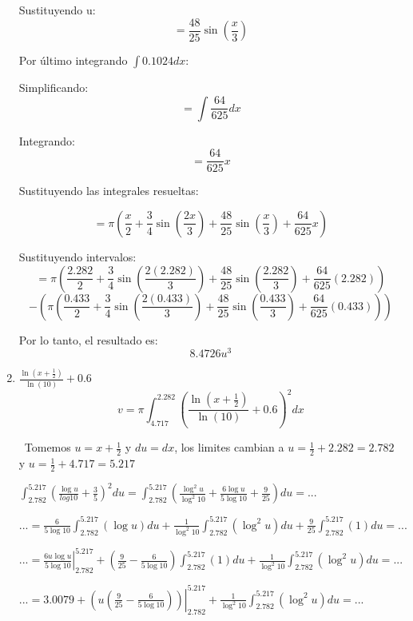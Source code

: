 \documentclass{article}
\begin{document}
\begin{enumerate}
    Sustituyendo u:
    $$ = \frac{48}{25} \sin(\frac{x}{3}) $$
    
    Por último integrando $\int 0.1024 dx$:
    
    Simplificando:
    $$ = \int \frac{64}{625} dx$$
    
    Integrando:
    $$  = \frac{64}{625} x $$
    
    Sustituyendo las integrales resueltas:
    
    $$ = \pi(\frac{x}{2}+\frac{3}{4} \sin \left(\frac{2 x}{3}\right) + \frac{48}{25} \sin(\frac{x}{3}) + \frac{64}{625} x )$$
    
    Sustituyendo intervalos:
    $$ = \pi(\frac{2.282}{2}+\frac{3}{4} \sin \left(\frac{2 (2.282)}{3}\right) + \frac{48}{25} \sin(\frac{2.282}{3}) + \frac{64}{625} (2.282) ) $$
    $$- (\pi(\frac{0.433}{2}+\frac{3}{4} \sin \left(\frac{2 (0.433)}{3}\right) + \frac{48}{25} \sin(\frac{0.433}{3}) + \frac{64}{625} (0.433) ))$$
    
    Por lo tanto, el resultado es:
    $$ 8.4726 u^3 $$
    
    \pagebreak
    \item $\frac{\ln \left(x+\frac{1}{2}\right)}{\ln (10)}+0.6$
    $$ v = \pi \int_{4.717}^{2.282} (\frac{\ln \left(x+\frac{1}{2}\right)}{\ln (10)}+0.6)^2 dx$$
    
    \ Tomemos $u=x+\frac{1}{2}$ y $du=dx$, los limites cambian a $u=\frac{1}{2}+2.282=2.782$ y 
        $u=\frac{1}{2}+4.717=5.217$\vspace{.3cm}

        $\displaystyle\int_{2.782}^{5.217}(\frac{\log{u}}{log{10}}+\frac{3}{5})^2du = 
        \displaystyle\int_{2.782}^{5.217}(\frac{\log^2{u}}{\log^2{10}}+\frac{6\log{u}}{5\log{10}}
        +\frac{9}{25})du = ...$\vspace{.3cm}
        
        $... = \frac{6}{5\log{10}}\displaystyle\int_{2.782}^{5.217}(\log{u})du + 
        \frac{1}{\log^2{10}}\displaystyle\int_{2.782}^{5.217}(\log^2{u})du + 
        \frac{9}{25}\displaystyle\int_{2.782}^{5.217}(1)du = ...$\vspace{.3cm}

        $... = \left . \frac{6u\log{u}}{5\log{10}}\right |_{2.782}^{5.217} + 
        (\frac{9}{25} - \frac{6}{5\log{10}})\displaystyle\int_{2.782}^{5.217}(1)du + 
        \frac{1}{\log^2{10}}\displaystyle\int_{2.782}^{5.217}(\log^2{u})du = ...$\vspace{.3cm}

        $... = 3.0079 + \left . (u(\frac{9}{25} - \frac{6}{5\log{10}})) \right |_{2.782}^{5.217} + 
        \frac{1}{\log^2{10}}\displaystyle\int_{2.782}^{5.217}(\log^2{u})du = ...$\vspace{.3cm}


\end{enumerate}
\end{document}
